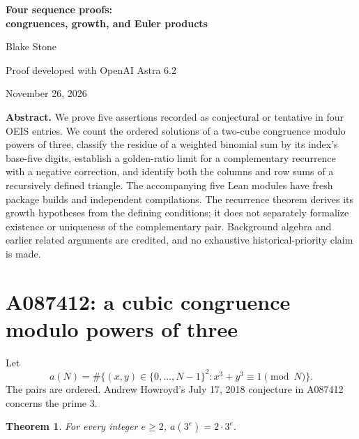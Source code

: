 \documentclass[11pt]{article}
\newtheorem{theorem}{Theorem}[section]
\begin{document}
\begin{center}
{\LARGE\bfseries Four sequence proofs:\\[3pt]
congruences, growth, and Euler products}\par
\vspace{0.5em}
{\large Blake Stone}\par
Proof developed with OpenAI Astra 6.2\par
November 26, 2026
\end{center}

\textbf{Abstract.}
We prove five assertions recorded as conjectural or tentative in four OEIS
entries. We count the ordered solutions of a two-cube congruence modulo
powers of three, classify the residue of a weighted binomial sum by its
index's base-five digits, establish a golden-ratio limit for a complementary
recurrence with a negative correction, and identify both the columns and
row sums of a recursively defined triangle. The accompanying five Lean
modules have fresh package builds and independent compilations. The
recurrence theorem derives its growth hypotheses from the defining
conditions; it does not separately formalize existence or uniqueness of
the complementary pair. Background algebra and earlier related arguments
are credited, and no exhaustive historical-priority claim is made.

\section{A087412: a cubic congruence modulo powers of three}

Let
\[
 a(N)=\#\{(x,y)\in\{0,\ldots,N-1\}^2:
                 x^3+y^3\equiv1\pmod N\}.
\]
The pairs are ordered. Andrew Howroyd's July 17, 2018 conjecture in
A087412~\cite{A087412} concerns the prime $3$.

\begin{theorem}\label{thm:cubes}
For every integer $e\ge2$, $a(3^e)=2\cdot3^e$.
\end{theorem}
\end{document}

